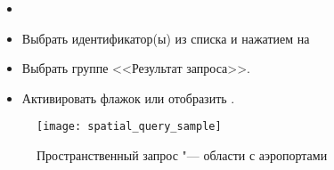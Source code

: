 \begin{itemize}[label=--]
\item {}
\item Выбрать идентификатор(ы) из списка и нажатием на 
\item Выбрать  группе <<Результат запроса>>.
\item Активировать флажок или отобразить .
\end{itemize}

\begin{figure}[ht]
   \centering
   \texttt{[image: spatial\_query\_sample]}
   \caption{Пространственный запрос "--- области с аэропортами \nixcaption}
   \label{fig:spatialquerysample}
\end{figure}

\FloatBarrier

